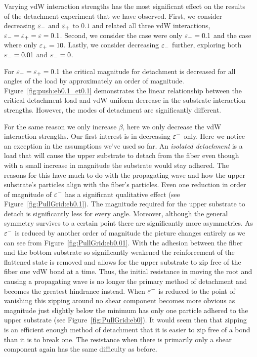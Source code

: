 Varying vdW interaction strengths has the most significant effect on the results of the detachment experiment that we have observed. First, we consider decreasing $\varepsilon_-$ and $\varepsilon_+$ to $0.1$ and related all three vdW interactions, $\varepsilon_- = \varepsilon_+ = \varepsilon = 0.1$. Second, we consider the case were only $\varepsilon_-=0.1$ and the case where only $\varepsilon_+=10$. Lastly, we consider decreasing $\varepsilon_-$ further, exploring both $\varepsilon_-=0.01$ and $\varepsilon_-=0$.

For $\varepsilon_- = \varepsilon_+ = 0.1$ the critical magnitude for detachment is decreased for all angles of the load by approximately an order of magnitude. Figure~\ref{fig:push:eb0.1_et0.1} demonstrates the linear relationship between the critical detachment load and vdW uniform decrease in the substrate interaction strengths. However, the modes of detachment are significantly different. 


For the same reason we only increase $\beta$, here we only decrease the vdW interaction strengths. Our first interest is in decreasing $\varepsilon^-$ only. Here we notice an exception in the assumptions we've used so far. An \textit{isolated detachment} is a load that will cause the upper substrate to detach from the fiber even though with a small increase in magnitude the substrate would stay adhered. The reasons for this have much to do with the propagating wave and how the upper substrate's particles align with the fiber's particles. Even one reduction in order of magnitude of $\varepsilon^-$ has a significant qualitative effect (see Figure~\ref{fig:PullGrid:eb0.1}). The magnitude required for the upper substrate to detach is significantly less for every angle. Moreover, although the general symmetry survives to a certain point there are significantly more asymmetries. As $\varepsilon^-$ is reduced by another order of magnitude the picture changes entirely as we can see from Figure~\ref{fig:PullGrid:eb0.01}. With the adhesion between the fiber and the bottom substrate so significantly weakened the reinforcement of the flattened state is removed and allows for the upper substrate to zip free of the fiber one vdW bond at a time. Thus, the initial resistance in moving the root and causing a propagating wave is no longer the primary method of detachment and becomes the greatest hindrance instead. When $\varepsilon^-$ is reduced to the point of vanishing this zipping around no shear component becomes more obvious as magnitude just slightly below the minimum has only one particle adhered to the upper substrate (see Figure~\ref{fig:PullGrid:eb0}). It would seem then that zipping is an efficient enough method of detachment that it is easier to zip free of a bond than it is to break one. The resistance when there is primarily only a shear component again has the same difficulty as before.

